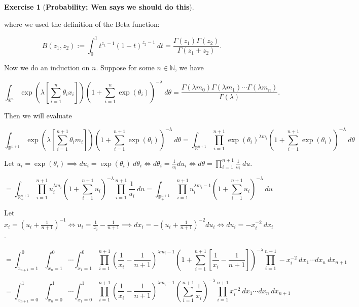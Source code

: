 \documentclass{article}
\theoremstyle{definition}
\newtheorem{exercise}{Exercise}
\theoremstyle{definition}
\theoremstyle{definition}
\theoremstyle{definition}
\begin{document}
\begin{exercise}[\textbf{Probability; Wen says we should do this}]
\begin{enumerate}[(a)]
where we used the definition of the Beta function:

\[
B(z_1, z_2) := \int_0^1 t^{z_1 - 1} (1-t)^{z_2 - 1} \ dt= \frac{ \Gamma(z_1) \Gamma(z_2)}{\Gamma(z_1 + z_2)}.
\]

Now we do an induction on \(n\). Suppose for some \(n \in \mathbb{N}\), we have

\begin{equation}\label{2017.screen.3.a.inductive.hypothesis}
\int_{\mathbb{R}^n} \exp \left( \lambda \left[ \sum_{i=1}^n \theta_i x_i \right] \right) \left(1 + \sum_{i=1}^n \exp(\theta_i) \right)^{-\lambda} \ d\theta = \frac{\Gamma(\lambda m_0) \Gamma(\lambda m_1) \cdots \Gamma(\lambda m_n)}{\Gamma(\lambda)}.
\end{equation}

Then we will evaluate

\[
\int_{\mathbb{R}^{n+1}} \exp \left( \lambda \left[ \sum_{i=1}^{n+1} \theta_i m_i \right] \right) \left(1 + \sum_{i=1}^{n+1} \exp(\theta_i) \right)^{-\lambda} \ d\theta  
= \int_{\mathbb{R}^{n+1}} \prod_{i=1}^{n+1} \exp(\theta_i)^{\lambda m_i}  \left(1 + \sum_{i=1}^{n+1} \exp(\theta_i) \right)^{-\lambda} \ d\theta 
\]


Let \(u_i=  \exp(\theta_i) \implies du_i =\exp(\theta_i) \ d\theta_i \iff d\theta_i = \frac{1}{u_i} du_i \iff d\theta=  \prod_{i=1}^{n+1}\frac{1}{u_i} \ du    \).


\[
= \int_{\mathbb{R}^{n+1}_+} \prod_{i=1}^{n+1} u_i^{\lambda m_i}  \left(1 + \sum_{i=1}^{n+1} u_i \right)^{-\lambda} \prod_{i=1}^{n+1}\frac{1}{u_i} \ du = \int_{\mathbb{R}_+^{n+1}} \prod_{i=1}^{n+1} u_i^{\lambda m_i - 1}  \left(1 + \sum_{i=1}^{n+1} u_i \right)^{-\lambda}  \ du
\]

Let \(x_i = \left(u_i + \frac{1}{n+1} \right)^{-1} \iff u_i = \frac{1}{x_i} - \frac{1}{n+1} \implies dx_i = -\left(u_i + \frac{1}{n+1} \right)^{-2} du_i \iff du_i = -x_i^{-2} \ dx_i  \).

\[
=  \int_{x_{n+1}=1}^0   \int_{x_{n}=1}^0 \cdots \int_{x_1=1}^0  \prod_{i=1}^{n+1} \left( \frac{1}{x_i} - \frac{1}{n+1} \right)^{\lambda m_i - 1}  \left(1 + \sum_{i=1}^{n+1} \left[ \frac{1}{x_i} - \frac{1}{n+1} \right]\right)^{-\lambda} \prod_{i=1}^{n+1} -x_i^{-2}  \ dx_1 \cdots dx_n \ dx_{n+1}
\]

\[
=  \int_{x_{n+1}=0}^1   \int_{x_{n}=0}^1 \cdots \int_{x_1=0}^1  \prod_{i=1}^{n+1} \left( \frac{1}{x_i} - \frac{1}{n+1} \right)^{\lambda m_i - 1}  \left( \sum_{i=1}^{n+1} \frac{1}{x_i}  \right)^{-\lambda} \prod_{i=1}^{n+1} x_i^{-2}  \ dx_1 \cdots dx_n \ dx_{n+1}
\]


\end{enumerate}
\end{exercise}
\end{document}
